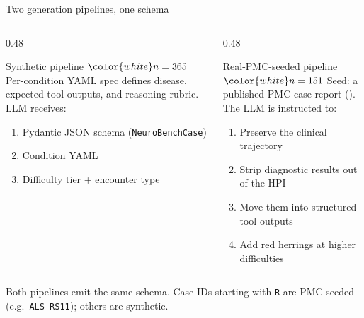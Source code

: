 \documentclass[aspectratio=169,t]{beamer}
\begin{document}
\begin{frame}{Two generation pipelines, one schema}
  \begin{columns}[T,onlytextwidth]
    \begin{column}{0.48\textwidth}
      \begin{exampleblock}{Synthetic pipeline \quad $\color{white}n = 365$}
      Per-condition YAML spec defines disease, expected tool
        outputs, and reasoning rubric.\\[0.5mm]
        LLM receives:
        \begin{enumerate}\setlength\itemsep{0.05em}
          \item Pydantic JSON schema (\texttt{NeuroBenchCase})
          \item Condition YAML
          \item Difficulty tier + encounter type
        \end{enumerate}
      \end{exampleblock}
    \end{column}%
    \hfill
    \begin{column}{0.48\textwidth}
      \begin{block}{Real-PMC-seeded pipeline \quad $\color{white}n = 151$}
        Seed: a published PMC case report
        (\cite{wu2025medcasereasoning}).\\[0.5mm]
        The LLM is instructed to:
        \begin{enumerate}\setlength\itemsep{0.05em}
          \item Preserve the clinical trajectory
          \item \alert{Strip} diagnostic results out of the HPI
          \item Move them into structured tool outputs
          \item Add red herrings at higher difficulties
        \end{enumerate}
      \end{block}
    \end{column}
  \end{columns}

  \vspace{5mm}
  \centering
  Both pipelines emit the same schema. Case IDs starting with
  \texttt{R} are PMC-seeded (e.g.\ \texttt{ALS-RS11}); others are synthetic.
\end{frame}
\end{document}
